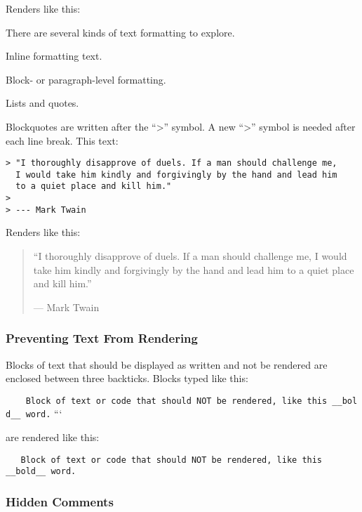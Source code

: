 \documentclass[
]{article}
\begin{document}
Renders like this:

There are several kinds of text formatting to explore.

Inline formatting text.

Block- or paragraph-level formatting.

Lists and quotes.

Blockquotes are written after the ``\textgreater{}'' symbol. A new
``\textgreater{}'' symbol is needed after each line break. This text:

\begin{verbatim}
> "I thoroughly disapprove of duels. If a man should challenge me,
  I would take him kindly and forgivingly by the hand and lead him
  to a quiet place and kill him."
>
> --- Mark Twain
\end{verbatim}

Renders like this:

\begin{quote}
``I thoroughly disapprove of duels. If a man should challenge me, I
would take him kindly and forgivingly by the hand and lead him to a
quiet place and kill him.''

--- Mark Twain
\end{quote}

\hypertarget{preventing-text-from-rendering}{%
\subsubsection{Preventing Text From
Rendering}\label{preventing-text-from-rendering}}

Blocks of text that should be displayed as written and not be rendered
are enclosed between three backticks. Blocks typed like this:

\texttt{\textasciigrave{}\textasciigrave{}\textasciigrave{}\ \ \ \ Block\ of\ text\ or\ code\ that\ should\ NOT\ be\ rendered,\ like\ this\ \_\_bold\_\_\ word.}
```

are rendered like this:

\begin{verbatim}
   Block of text or code that should NOT be rendered, like this __bold__ word.
\end{verbatim}

\hypertarget{hidden-comments}{%
\subsubsection{Hidden Comments}\label{hidden-comments}}
\end{document}
